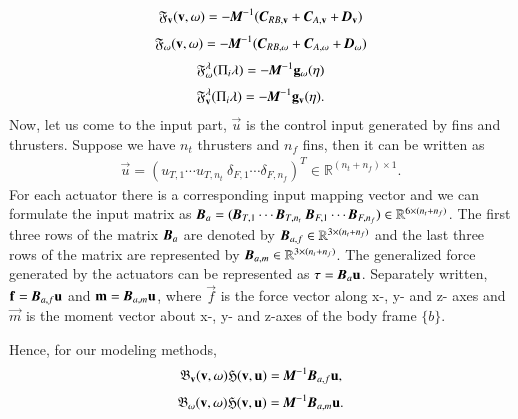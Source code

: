\begin{align}
\mathfrak{F}_{\vec{v}}(\vec{v},\vec{\omega})=
-\emph{\textbf{M}}^{-1}(\emph{\textbf{C}}_{RB,\vec{v}}+\emph{\textbf{C}}_{A,\vec{v}}+\emph{\textbf{D}}_{\vec{v}})
\end{align}
\begin{align}
\mathfrak{F}_{\vec{\omega}}(\vec{v},\vec{\omega})=
-\emph{\textbf{M}}^{-1}(\emph{\textbf{C}}_{RB,\vec{\omega}}+\emph{\textbf{C}}_{A,\vec{\omega}}+\emph{\textbf{D}}_{\vec{\omega}})
\end{align}
\begin{align}
\mathfrak{F}_{\vec{\omega}}^{\vec{\lambda}}(\Pi_{i}\vec{\lambda})=
-\emph{\textbf{M}}^{-1}\vec{g}_{\vec{\omega}}(\vec{\eta})
\end{align}
\begin{align}
\mathfrak{F}_{\vec{v}}^{\vec{\lambda}}(\Pi_{i}\vec{\lambda})=
-\emph{\textbf{M}}^{-1}\vec{g}_{\vec{v}}(\vec{\eta}).
\end{align}
Now, let us come to the input part, $\vec{u}$ is the control input generated by fins and thrusters. Suppose we have $n_{t}$ thrusters and $n_{f}$ fins, then it can be written as 
\begin{align}
\vec{u}=(u_{T,1}\cdots u_{T,n_{t}}~ \delta_{F,1} \cdots \delta_{F,n_{f}})^{T}\in \mathbb{R}^{(n_{t}+n_{f})\times 1}. 
\end{align}
For each actuator there is a corresponding input mapping vector and we can formulate the input matrix as $\emph{\textbf{B}}_{a}=(\emph{\textbf{B}}_{T,1} \cdots \emph{\textbf{B}}_{T,n_{t}}~\emph{\textbf{B}}_{F,1} \cdots \emph{\textbf{B}}_{F,n_{f}})\in \mathbb{R}^{6\times(n_{t}+n_{f})}$.
The first three rows of the matrix $\emph{\textbf{B}}_{a}$ are denoted by $\emph{\textbf{B}}_{a,f}\in \mathbb{R}^{3\times(n_{t}+n_{f})}$ and the last three rows of the matrix are represented by $\emph{\textbf{B}}_{a,m}\in \mathbb{R}^{3\times(n_{t}+n_{f})}$. The generalized force generated by the actuators can be represented as $\vec{\tau}=\emph{\textbf{B}}_{a}\vec{u}$. Separately written, $\vec{f}=\emph{\textbf{B}}_{a,f}\vec{u}$ and $\vec{m}=\emph{\textbf{B}}_{a,m}\vec{u}$, where $\vec{f}$ is the force vector along x-, y- and z- axes and $\vec{m}$ is the moment vector about x-, y- and z-axes of the body frame $\lbrace b \rbrace$.

Hence, for our modeling methods, 
\begin{align}
\mathfrak{B}_{\vec{v}}(\vec{v},\vec{\omega})\mathfrak{H}(\vec{v},\vec{u})=
\emph{\textbf{M}}^{-1}\emph{\textbf{B}}_{a,f}\vec{u},
\end{align}
\begin{align}
\mathfrak{B}_{\vec{\omega}}(\vec{v},\vec{\omega})\mathfrak{H}(\vec{v},\vec{u})=
\emph{\textbf{M}}^{-1}\emph{\textbf{B}}_{a,m}\vec{u}.
\end{align}

